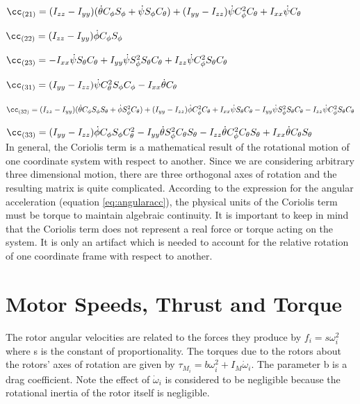 $\cc_{(21)} = (I_{zz}-I_{yy})   ( \dot{\theta} C_{\phi} S_{\phi} +  \dot{\psi} S_{\phi} C_{\theta} ) + (I_{yy}-I_{zz})    \dot{\psi}   C_{\phi}^2  C_{\theta} + I_{xx}    \dot{\psi}   C_{\theta}$


$\cc_{(22)}  = (I_{zz}-I_{yy}) \dot{\phi} C_{\phi} S_{\phi}$


$\cc_{(23)}  = -I_{xx}  \dot{\psi} S_{\theta} C_{\theta} + I_{yy}  \dot{\psi} S_{\phi}^2 S_{\theta} C_{\theta} + I_{zz} \dot{\psi} C_{\phi}^2 S_{\theta} C_{\theta}$


$\cc_{(31)} = (I_{yy}-I_{zz}) \dot{\psi} C_{\theta}^2 S_{\phi} C_{\phi} - I_{xx} \dot{\theta} C_{\theta}$


$\cc_{(32)}  = (I_{zz}-I_{yy}) ( \dot{\theta} C_{\phi} S_{\phi} S_{\theta} + \dot{\phi} S_{\phi}^2 C_{\theta} ) + (I_{yy}-I_{zz}) \dot{\phi} C_{\phi}^2 C_{\theta} + I_{xx}  \dot{\psi} S_{\theta} C_{\theta} - I_{yy}  \dot{\psi} S_{\phi}^2 S_{\theta} C_{\theta} - I_{zz}  \dot{\psi} C_{\phi}^2 S_{\theta} C_{\theta}$


$\cc_{(33)} = (I_{yy}-I_{zz})   \dot{\phi}  C_{\phi} S_{\phi} C_{\theta}^2 - I_{yy}   \dot{\theta} S_{\phi}^2 C_{\theta} S_{\theta} - I_{zz} \dot{\theta} C_{\phi}^2 C_{\theta} S_{\theta} + I_{xx} \dot{\theta} C_{\theta} S_{\theta}$\\



 
In general, the Coriolis term is a mathematical result of the rotational motion of one coordinate system with respect to another. Since we are considering arbitrary three dimensional motion, there are three orthogonal axes of rotation and the resulting matrix is quite complicated. According to the expression for the angular acceleration (equation \eqref{eq:angularacc}), the physical units of the Coriolis term must be torque to maintain algebraic continuity. It is important to keep in mind that the Coriolis term does not represent a real force or torque acting on the system. It is only an artifact which is needed to account for the relative rotation of one coordinate frame with respect to another.   




\section{Motor Speeds, Thrust and Torque}

\indent The rotor angular velocities are related to the forces they produce by $f_i = s \omega^2_i$ where s is the constant of proportionality.
The torques due to the rotors about the rotors' axes of rotation are given by $\tau_{M_i} = b \omega^2_i + I_M \dot{\omega}_i$. The parameter b is a drag coefficient. Note the effect of $\dot{\omega}_i$ is considered to be negligible because the rotational inertia of the rotor itself is negligible.

